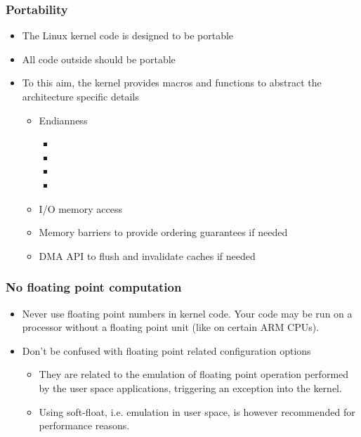 \begin{frame}
  \frametitle{Portability}
  \begin{itemize}
  \item The Linux kernel code is designed to be portable
  \item All code outside  should be portable
  \item To this aim, the kernel provides macros and functions to
    abstract the architecture specific details
    \begin{itemize}
    \item Endianness
      \begin{itemize}
      \item {}
      \item {}
      \item {}
      \item {}
      \end{itemize}
    \item I/O memory access
    \item Memory barriers to provide ordering guarantees if needed
    \item DMA API to flush and invalidate caches if needed
    \end{itemize}
  \end{itemize}
\end{frame}

\begin{frame}
  \frametitle{No floating point computation}
  \begin{itemize}
  \item Never use floating point numbers in kernel code. Your code may
    be run on a processor without a floating point unit (like on
    certain ARM CPUs).
  \item Don't be confused with floating point related configuration
    options
    \begin{itemize}
    \item They are related to the emulation of floating point
      operation performed by the user space applications, triggering
      an exception into the kernel.
    \item Using soft-float, i.e. emulation in user space, is however
      recommended for performance reasons.
    \end{itemize}
  \end{itemize}
\end{frame}

